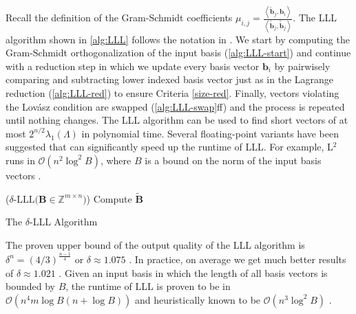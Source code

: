 Recall the definition of the Gram-Schmidt coefficients $\mu_{i, j} = \frac{\left\langle \tilde{\mathbf{b}}_j, \mathbf{b}_i\right\rangle}{\left\langle \tilde{\mathbf{b}}_j, \tilde{\mathbf{b}}_j\right\rangle}$. The LLL algorithm shown in \cref{alg:LLL} follows the notation in \cite{LLLReg04}. We start by computing the Gram-Schmidt orthogonalization of the input basis (\cref{alg:LLL-start}) and continue with a reduction step in which we update every basis vector $\mathbf{b}_i$ by pairwisely comparing and subtracting lower indexed basis vector just as in the Lagrange reduction (\cref{alg:LLL-red}) to ensure Criteria \ref{size-red}. Finally, vectors violating the Lovász condition are swapped (\cref{alg:LLL-swap}ff) and the process is repeated until nothing changes. The LLL algorithm can be used to find short vectors of at most $2^{n/2} \lambda_1(\Lambda)$ in polynomial time. Several floating-point variants have been suggested that can significantly speed up the runtime of LLL. For example, L$^2$ runs in $\mathcal{O}(n^2 \log^2 B)$, where $B$ is a bound on the norm of the input basis vectors \cite{NS05}. %

\begin{algorithm2e}
  \Begin($\delta\text{-LLL} {(}\mathbf{B} \in \mathbb{Z}^{m\times n} {)}$) %
  {
    Compute $\tilde{\mathbf{B}}$\label{alg:LLL-start}\\
  }
  \caption{The $\delta$-LLL Algorithm \cite{LLL82}} \label{alg:LLL}
\end{algorithm2e}


The proven upper bound of the output quality of the LLL algorithm is $\delta^n = \left(4/3\right)^{\frac{n-1}{4}}$ or $\delta \approx 1.075$ \cite{LLL82}. In practice, on average we get much better results of $\delta \approx 1.021$ \cite{Chen13}. Given an input basis in which the length of all basis vectors is bounded by $B$, the runtime of LLL is proven to be in $\mathcal{O}\left(n^4m\log B(n+\log B)\right)$ \cite{NS05} and heuristically known to be $\mathcal{O}\left(n^{3}\log^2 B\right)$ \cite{APS15}.



